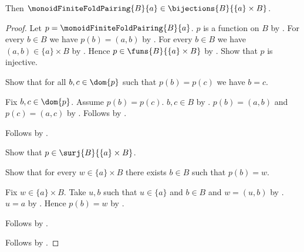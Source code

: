 \begin{proposition}\label{monoid_finite_fold_pairing_bijection}
    Then
        $\monoidFiniteFoldPairing{B}{a}
            \in\bijections{B}{\{a\}\times B}$.
\end{proposition}
\begin{proof}
    Let $p=\monoidFiniteFoldPairing{B}{a}$.
    $p$ is a function on $B$ by
        .
    For every $b\in B$ we have $p(b)=(a,b)$ by
        .
    For every $b\in B$ we have $(a,b)\in\{a\}\times B$ by
        .
    Hence $p\in\funs{B}{\{a\}\times B}$ by
        .
    Show that $p$ is injective.
    \begin{subproof}
        Show that for all $b,c\in\dom{p}$ such that $p(b)=p(c)$
            we have $b=c$.
        \begin{subproof}
            Fix $b,c\in\dom{p}$.
            Assume $p(b)=p(c)$.
            $b,c\in B$ by .
            $p(b)=(a,b)$ and $p(c)=(a,c)$ by
                .
            Follows by .
        \end{subproof}
        Follows by .
    \end{subproof}
    Show that $p\in\surj{B}{\{a\}\times B}$.
    \begin{subproof}
        Show that for every $w\in\{a\}\times B$ there exists $b\in B$
            such that $p(b)=w$.
        \begin{subproof}
            Fix $w\in\{a\}\times B$.
            Take $u,b$ such that $u\in\{a\}$ and $b\in B$ and
                $w=(u,b)$ by
                .
            $u=a$ by .
            Hence $p(b)=w$ by
                .
        \end{subproof}
        Follows by .
    \end{subproof}
    Follows by .
\end{proof}

